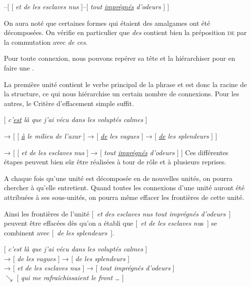 –[ [ \textit{et de les esclaves nus} ]–[ \textit{tout \uline{imprégnés} d’odeurs} ] ]
\z

On aura noté que certaines formes qui étaient des amalgames ont été décomposées. On vérifie en particulier que \textit{des} contient bien la préposition \textsc{de} par la commutation avec \textit{de ces}.

\begin{tblsframed}{}
\noindent Pour toute connexion, nous pouvons repérer sa tête et la hiérarchiser pour en faire une .
\end{tblsframed}

La première unité contient le verbe principal de la phrase et est donc la racine de la structure, ce qui nous hiérarchise un certain nombre de connexions. Pour les autres, le Critère d’effacement simple suffit.

\ea{}
[ \textit{c’\uline{est} là que j’ai vécu dans les voluptés calmes} ]

→ [ [ \textit{\uline{à} le milieu de l’azur} ] → [ \textit{\uline{de} les vagues} ] → [ \textit{\uline{de} les splendeurs} ] ]

→ [ [ \textit{et de les esclaves nus} ] → [ \textit{tout \uline{imprégnés} d’odeurs} ] ]
\z
Ces différentes étapes peuvent bien sûr être réalisées à tour de rôle et à plusieurs reprises.

\begin{tblsframed}{}
\noindent A chaque fois qu’une unité est décomposée en de nouvelles unités, on pourra chercher à  qu’elle entretient. Quand toutes les connexions d’une unité auront été attribuées à ses sous-unités, on pourra même effacer les frontières de cette unité.
\end{tblsframed}

Ainsi les frontières de l’unité [~\textit{et des esclaves nus tout imprégnés d’odeurs}~] peuvent être effacées dès qu’on a établi que [~\textit{et de les esclaves nu}s~] se combinent avec [~\textit{de les splendeurs}~].

\ea{} [ \textit{c’est là que j’ai vécu dans les voluptés calmes} ]\\
\glll{}  {→} {[ \textit{de les vagues} ] → [ \textit{de les splendeurs} ]}\\
            {→ [ \textit{et de les esclaves nus} ]} {→} {[ \textit{tout imprégnés d’odeurs} ]}\\
                          {}                          {$\searrow $} {[ \textit{qui me rafraîchissaient le front …} ]}\\
\z

